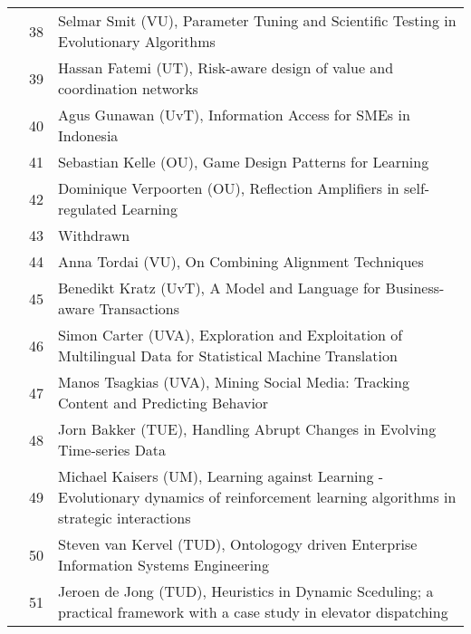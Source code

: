 \begin{longtabu}{@{}l@{ }l@{\hspace{1em}}X}
	&	 38	&	 Selmar Smit (VU), Parameter Tuning and Scientific Testing in Evolutionary Algorithms\\
	&	 39	&	 Hassan Fatemi (UT), Risk-aware design of value and coordination networks\\
	&	 40	&	 Agus Gunawan (UvT), Information Access for SMEs in Indonesia\\
	&	 41	&	 Sebastian Kelle (OU), Game Design Patterns for Learning\\
	&	 42	&	 Dominique Verpoorten (OU), Reflection Amplifiers in self-regulated Learning\\
	&	 43	&	 Withdrawn \\
	&	 44	&	 Anna Tordai (VU), On Combining Alignment Techniques\\
	&	 45	&	 Benedikt Kratz (UvT), A Model and Language for Business-aware Transactions\\
	&	 46	&	 Simon Carter (UVA), Exploration and Exploitation of Multilingual Data for Statistical Machine Translation\\
	&	 47	&	 Manos Tsagkias (UVA), Mining Social Media: Tracking Content and Predicting Behavior\\
	&	 48	&	 Jorn Bakker (TUE), Handling Abrupt Changes in Evolving Time-series Data\\
	&	 49	&	 Michael Kaisers (UM), Learning against Learning - Evolutionary dynamics of reinforcement learning algorithms in strategic interactions\\
	&	 50	&	 Steven van Kervel (TUD), Ontologogy driven Enterprise Information Systems Engineering\\
	&	 51	&	 Jeroen de Jong (TUD), Heuristics in Dynamic Sceduling; a practical framework with a case study in elevator dispatching\\


\end{longtabu}

